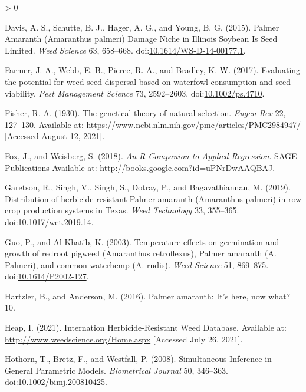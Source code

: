\documentclass[utf8]{frontiersSCNS}
\newlength{\cslhangindent}
\newenvironment{CSLReferences}[2] %
 {%
  \setlength{\parindent}{0pt}
  \ifodd #1 \everypar{\setlength{\hangindent}{\cslhangindent}}\ignorespaces\fi
  \ifnum #2 > 0
  \setlength{\parskip}{#2\baselineskip}
  \fi
 }%
 {}
\begin{document}
\begin{CSLReferences}{1}{0}
\leavevmode\hypertarget{ref-davis2015}{}%
Davis, A. S., Schutte, B. J., Hager, A. G., and Young, B. G. (2015).
Palmer {Amaranth} ({Amaranthus} palmeri) {Damage Niche} in {Illinois
Soybean Is Seed Limited}. \emph{Weed Science} 63, 658--668.
doi:\href{https://doi.org/10.1614/WS-D-14-00177.1}{10.1614/WS-D-14-00177.1}.

\leavevmode\hypertarget{ref-farmer2017}{}%
Farmer, J. A., Webb, E. B., Pierce, R. A., and Bradley, K. W. (2017).
Evaluating the potential for weed seed dispersal based on waterfowl
consumption and seed viability. \emph{Pest Management Science} 73,
2592--2603. doi:\href{https://doi.org/10.1002/ps.4710}{10.1002/ps.4710}.

\leavevmode\hypertarget{ref-fisher1930}{}%
Fisher, R. A. (1930). The genetical theory of natural selection.
\emph{Eugen Rev} 22, 127--130. Available at:
\url{https://www.ncbi.nlm.nih.gov/pmc/articles/PMC2984947/} {[}Accessed
August 12, 2021{]}.

\leavevmode\hypertarget{ref-fox2018}{}%
Fox, J., and Weisberg, S. (2018). \emph{An {R Companion} to {Applied
Regression}}. {SAGE Publications} Available at:
\url{http://books.google.com?id=uPNrDwAAQBAJ}.

\leavevmode\hypertarget{ref-garetson2019}{}%
Garetson, R., Singh, V., Singh, S., Dotray, P., and Bagavathiannan, M.
(2019). Distribution of herbicide-resistant {Palmer} amaranth
({Amaranthus} palmeri) in row crop production systems in {Texas}.
\emph{Weed Technology} 33, 355--365.
doi:\href{https://doi.org/10.1017/wet.2019.14}{10.1017/wet.2019.14}.

\leavevmode\hypertarget{ref-guo2003}{}%
Guo, P., and Al-Khatib, K. (2003). Temperature effects on germination
and growth of redroot pigweed ({Amaranthus} retroflexus), {Palmer}
amaranth ({A}. Palmeri), and common waterhemp ({A}. rudis). \emph{Weed
Science} 51, 869--875.
doi:\href{https://doi.org/10.1614/P2002-127}{10.1614/P2002-127}.

\leavevmode\hypertarget{ref-hartzler2016}{}%
Hartzler, B., and Anderson, M. (2016). Palmer amaranth: {It}'s here, now
what? 10.

\leavevmode\hypertarget{ref-heap2021}{}%
Heap, I. (2021). Internation {Herbicide}-{Resistant Weed Database}.
Available at: \url{http://www.weedscience.org/Home.aspx} {[}Accessed
July 26, 2021{]}.

\leavevmode\hypertarget{ref-hothorn2008}{}%
Hothorn, T., Bretz, F., and Westfall, P. (2008). Simultaneous
{Inference} in {General Parametric Models}. \emph{Biometrical Journal}
50, 346--363.
doi:\href{https://doi.org/10.1002/bimj.200810425}{10.1002/bimj.200810425}.


\end{CSLReferences}
\end{document}
